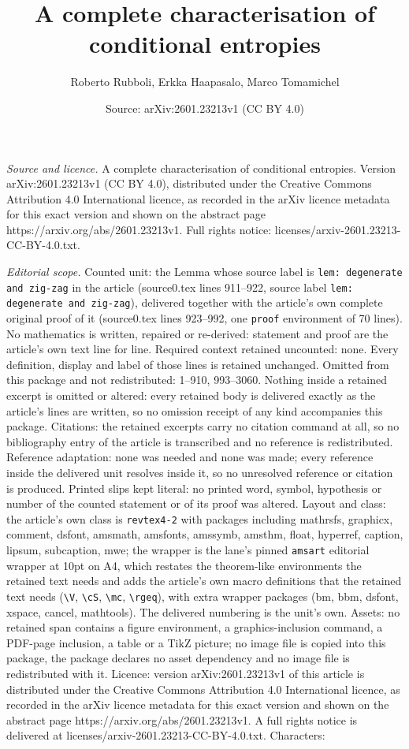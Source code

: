 \documentclass[10pt,a4paper]{amsart}
\title[A complete characterisation of conditional entropies]{A complete characterisation of conditional entropies}
\author{Roberto Rubboli, Erkka Haapasalo, Marco Tomamichel}
\date{Source: arXiv:2601.23213v1 (CC BY 4.0)}
\begin{document}
\maketitle

\noindent\emph{Source and licence.} A complete characterisation of conditional entropies. Version arXiv:2601.23213v1 (CC BY 4.0), distributed under the Creative Commons Attribution 4.0 International licence, as recorded in the arXiv licence metadata for this exact version and shown on the abstract page https://arxiv.org/abs/2601.23213v1. Full rights notice: licenses/arxiv-2601.23213-CC-BY-4.0.txt.\par\smallskip

\noindent\textit{Editorial scope.} Counted unit: the Lemma whose source label is \texttt{lem: degenerate and zig-zag} in the article (source0.tex lines 911--922, source label \texttt{lem: degenerate and zig-zag}), delivered together with the article's own complete original proof of it (source0.tex lines 923--992, one \texttt{proof} environment of 70 lines). No mathematics is written, repaired or re-derived: statement and proof are the article's own text line for line. Required context retained uncounted: none. Every definition, display and label of those lines is retained unchanged. Omitted from this package and not redistributed: 1--910, 993--3060. Nothing inside a retained excerpt is omitted or altered: every retained body is delivered exactly as the article's lines are written, so no omission receipt of any kind accompanies this package. Citations: the retained excerpts carry no citation command at all, so no bibliography entry of the article is transcribed and no reference is redistributed. Reference adaptation: none was needed and none was made; every reference inside the delivered unit resolves inside it, so no unresolved reference or citation is produced. Printed slips kept literal: no printed word, symbol, hypothesis or number of the counted statement or of its proof was altered. Layout and class: the article's own class is \texttt{revtex4-2} with packages including mathrsfs, graphicx, comment, dsfont, amsmath, amsfonts, amssymb, amsthm, float, hyperref, caption, lipsum, subcaption, mwe; the wrapper is the lane's pinned \texttt{amsart} editorial wrapper at 10pt on A4, which restates the theorem-like environments the retained text needs and adds the article's own macro definitions that the retained text needs (\texttt{\textbackslash V}, \texttt{\textbackslash cS}, \texttt{\textbackslash mc}, \texttt{\textbackslash rgeq}), with extra wrapper packages (bm, bbm, dsfont, xspace, cancel, mathtools). The delivered numbering is the unit's own. Assets: no retained span contains a figure environment, a graphics-inclusion command, a PDF-page inclusion, a table or a TikZ picture; no image file is copied into this package, the package declares no asset dependency and no image file is redistributed with it. Licence: version arXiv:2601.23213v1 of this article is distributed under the Creative Commons Attribution 4.0 International licence, as recorded in the arXiv licence metadata for this exact version and shown on the abstract page https://arxiv.org/abs/2601.23213v1. A full rights notice is delivered at licenses/arxiv-2601.23213-CC-BY-4.0.txt. Characters: 
\end{document}
